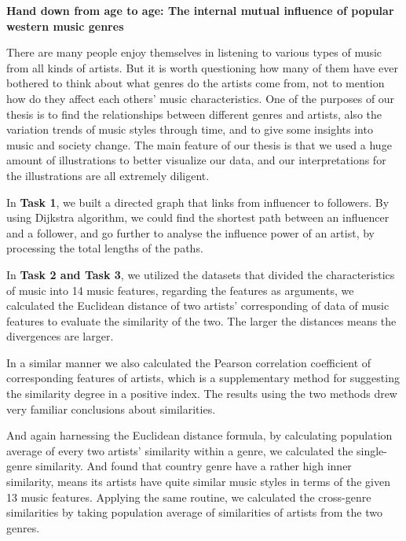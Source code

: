 \documentclass[12pt]{article}
\begin{document}
\begin{center}
 \large \textbf{Hand down from age to age: The internal mutual influence of popular western music genres}
\end{center}
\begin{flushleft}\quad
There are many people enjoy themselves in listening to various types of music from all kinds of artists. But it is worth questioning how many of them have ever bothered to think about what genres do the artists come from, not to mention how do they affect each others' music characteristics. One of the purposes of our thesis is to find the relationships between different genres and artists, also the variation trends of music styles through time, and to give some insights into music and society change. The main feature of our thesis is that we used a huge amount of illustrations to better visualize our data, and our interpretations for the illustrations are all extremely diligent. 

\quad In \textbf{Task 1}, we built a directed graph that links from influencer to followers. By using Dijkstra algorithm, we could find
the shortest path between an influencer and a follower, and go further to analyse the influence power of an artist, by processing the total lengths of the paths. 

\quad In \textbf{Task 2 and Task 3}, we utilized the datasets that divided the characteristics of music into 14 music features, regarding the features as arguments, we calculated the Euclidean distance of two artists' corresponding of data of music features to evaluate the similarity of the two. The larger the distances means the divergences are larger. 

\quad In a similar manner we also calculated the Pearson correlation coefficient of corresponding features of artists, which is a supplementary method for suggesting the similarity degree in a positive index. The results using the two methods drew very familiar conclusions about similarities.

\quad And again harnessing the Euclidean distance formula, by calculating population average of every two artists' similarity within a genre, we calculated the single-genre similarity.
And found that country genre have a rather high inner similarity, means its artists have quite similar music styles in terms of the given 13 music features. Applying the same routine, we calculated the cross-genre similarities by taking population average of similarities of artists from the two genres.


\end{flushleft}
\end{document}

